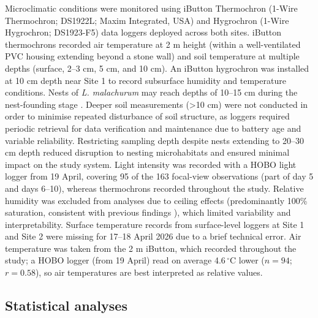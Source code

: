 \documentclass[11pt,a4paper]{article}
\begin{document}
Microclimatic conditions were monitored using iButton Thermochron (1-Wire Thermochron; DS1922L; Maxim Integrated, USA) and Hygrochron (1-Wire Hygrochron; DS1923-F5) data loggers deployed across both sites. iButton thermochrons recorded air temperature at 2 m height (within a well-ventilated PVC housing extending beyond a stone wall) and soil temperature at multiple depths (surface, 2–3 cm, 5 cm, and 10 cm). An iButton hygrochron was installed at 10 cm depth near Site 1 to record subsurface humidity and temperature conditions. Nests of \textit{L. malachurum} may reach depths of 10–15 cm during the nest-founding stage \citep{Knerer1992, Legewie1925, Noll1931}. Deeper soil measurements (>10 cm) were not conducted in order to minimise repeated disturbance of soil structure, as loggers required periodic retrieval for data verification and maintenance due to battery age and variable reliability. Restricting sampling depth despite nests extending to 20–30 cm depth \citep{Lienhard2010} reduced disruption to nesting microhabitats and ensured minimal impact on the study system. Light intensity was recorded with a HOBO light logger from 19 April, covering 95 of the 163 focal-view observations (part of day 5 and days 6--10), whereas thermochrons recorded throughout the study. Relative humidity was excluded from analyses due to ceiling effects (predominantly 100\% saturation, consistent with previous findings \citep{Potts1997}), which limited variability and interpretability. Surface temperature records from surface-level loggers at Site 1 and Site 2 were missing for 17–18 April 2026 due to a brief technical error. Air temperature was taken from the 2 m iButton, which recorded throughout the study; a HOBO logger (from 19 April) read on average 4.6\,$^\circ$C lower ($n = 94$; $r = 0.58$), so air temperatures are best interpreted as relative values.

\subsection{Statistical analyses}
\end{document}
